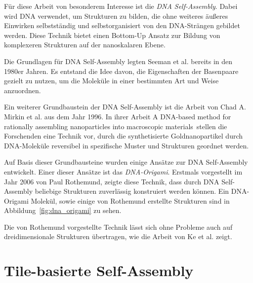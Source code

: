 Für diese Arbeit von besonderem Interesse ist die \emph{DNA Self-Assembly}. 
Dabei wird DNA verwendet, um Strukturen zu bilden, die ohne weiteres äußeres Einwirken selbstständig und selbstorganisiert von den DNA-Strängen gebildet werden. Diese Technik bietet einen Bottom-Up Ansatz zur Bildung von komplexeren Strukturen auf der nanoskalaren Ebene. 

Die Grundlagen für DNA Self-Assembly legten Seeman et al. bereits in den 1980er Jahren. 
Es entstand die Idee davon, die Eigenschaften der Basenpaare gezielt zu nutzen, um die Moleküle in einer bestimmten Art und Weise anzuordnen.\cite{seeman1982dna}

Ein weiterer Grundbaustein der DNA Self-Assembly ist die Arbeit von Chad A. Mirkin et al. aus dem Jahr 1996. 
In ihrer Arbeit \glqq A DNA-based method for rationally assembling nanoparticles into macroscopic materials\grqq\, stellen die Forschenden eine Technik vor, durch die synthetisierte Goldnanopartikel durch DNA-Moleküle reversibel in spezifische Muster und Strukturen geordnet werden.\cite{mirkin1996assembling} 

Auf Basis dieser Grundbausteine wurden einige Ansätze zur DNA Self-Assembly entwickelt. 
Einer dieser Ansätze ist das \emph{DNA-Origami}. 
Erstmals vorgestellt im Jahr 2006 von Paul Rothemund, zeigte diese Technik, dass durch DNA Self-Assembly beliebige Strukturen zuverlässig konstruiert werden können. 
Ein DNA-Origami Molekül, sowie einige von Rothemund erstellte Strukturen sind in Abbildung~\ref{fig:dna_origami} zu sehen.\cite{rothemund2006origami}


Die von Rothemund vorgestellte Technik lässt sich ohne Probleme auch auf dreidimensionale Strukturen übertragen, wie die Arbeit von Ke et al. zeigt. \cite{ke2009origami3d}

\section{Tile-basierte Self-Assembly}

